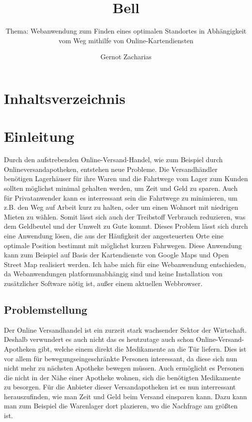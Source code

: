 \documentclass[a4paper, twoside, 12pt]{scrreprt}
\title{Bell}
\author{Gernot Zacharias}
\subtitle{Thema: Webanwendung zum Finden eines optimalen Standortes in Abhängigkeit vom Weg mithilfe von Online-Kartendiensten}
\begin{document}
\listoftodos
\maketitle
\cleardoublepage
\chapter {Inhaltsverzeichnis}

\setcounter{page}{1}
\chapter {Einleitung}
Durch den aufstrebenden Online-Versand-Handel, wie zum Beispiel durch Onlineversandapotheken, entstehen neue Probleme.
Die Versandhändler benötigen Lagerhäuser für ihre Waren und die Fahrtwege vom Lager zum Kunden sollten möglichst minimal gehalten werden,
um Zeit und Geld zu sparen. Auch für Privatanwender kann es interressant sein die Fahrtwege zu minimieren, um z.B. den Weg auf Arbeit kurz zu halten, oder
um einen Wohnort mit niedrigen Mieten zu wählen. Somit lässt sich auch der Treibstoff Verbrauch reduzieren, was dem Geldbeutel und der Umwelt zu Gute kommt.
Dieses Problem lässt sich durch eine Anwendung lösen, die aus der Häufigkeit der angesteuerten Orte eine optimale Position bestimmt mit möglichst 
kurzen Fahrwegen. Diese Anwendung kann zum Beispiel auf Basis  der Kartendienste von Google Maps und Open Street Map realisiert werden.
Ich habe mich für eine Webanwendung entschieden, da Webanwendungen platformunabhängig sind und keine Installation von zusätzlicher Software nötig ist, außer 
einem aktuellen Webbrowser.
\cleardoublepage
\section {Problemstellung}
Der Online Versandhandel ist ein zurzeit stark wachsender Sektor der Wirtschaft.
Deshalb verwundert es auch nicht das es heutzutage auch schon Online-Versand-Apotheken gibt, welche einem direkt die Medikamente an die Tür liefern.
Dies ist vor allem für bewegungseingeschränkte Personen interessant, da diese sich nun nicht mehr zu nächsten Apotheke bewegen müssen.
Auch ermöglicht es Personen die nicht in der Nähe einer Apotheke wohnen, sich die benötigten Medikamente zu besorgen.
Für die Anbieter dieser Versandapotheken ist es nun interressant herauszufinden, wie man Zeit und Geld beim Versand einsparen kann.
Dazu kann man zum Beispiel die Warenlager dort plazieren, wo die Nachfrage am größten ist.
\end{document}
